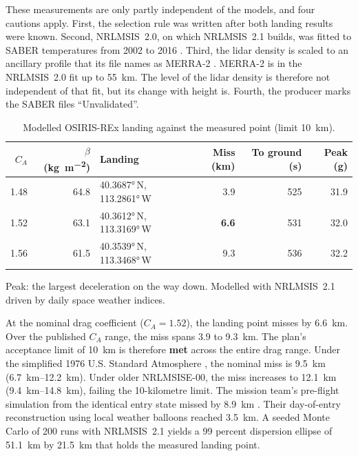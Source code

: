 \documentclass[11pt,a4paper]{article}
\begin{document}
These measurements are only partly independent of the models, and four cautions apply. First,
the selection rule was written after both landing results were known. Second, NRLMSIS~2.0, on
which NRLMSIS~2.1 builds, was fitted to SABER temperatures from 2002 to 2016
\citep{emmert2021}. Third, the lidar density is scaled to an ancillary profile that its file
names as MERRA-2 \citep{gelaro2017}. MERRA-2 is in the NRLMSIS~2.0 fit up to \qty{55}{\km}. The
level of the lidar density is therefore not independent of that fit, but its change with height
is. Fourth, the producer marks the SABER files ``Unvalidated''.

\begin{table}[htbp]
\centering\small
\caption{Modelled OSIRIS-REx landing against the measured point (limit \qty{10}{\km}).}
\label{tab:capsule}
\begin{tabular}{@{}rrlrrr@{}}
\toprule
$C_A$ & $\beta$ (\unit{\kg\per\m\squared}) & Landing & Miss (\unit{\km}) & To ground (\unit{\s}) & Peak (g) \\
\midrule
1.48 & 64.8 & \ang{40.3687}\,N, \ang{113.2861}\,W & 3.9 & 525 & 31.9 \\
1.52 & 63.1 & \ang{40.3612}\,N, \ang{113.3169}\,W & \textbf{6.6} & 531 & 32.0 \\
1.56 & 61.5 & \ang{40.3539}\,N, \ang{113.3468}\,W & 9.3 & 536 & 32.2 \\
\bottomrule
\end{tabular}
\par\smallskip\footnotesize Peak: the largest deceleration on the way down. Modelled with
NRLMSIS~2.1 driven by daily space weather indices.
\end{table}

At the nominal drag coefficient ($C_A = 1.52$), the landing point misses by \qty{6.6}{\km}.
Over the published $C_A$ range, the miss spans 3.9 to \qty{9.3}{\km}. The plan's acceptance
limit of \qty{10}{\km} is therefore \textbf{met} across the entire drag range. Under the simplified
1976 U.S. Standard Atmosphere \citep{ussa1976}, the nominal miss is \qty{9.5}{\km}
(\qtyrange{6.7}{12.2}{\km}). Under older NRLMSISE-00, the miss increases to \qty{12.1}{\km}
(\qtyrange{9.4}{14.8}{\km}), failing the 10-kilometre limit. The mission team's pre-flight
simulation from the identical entry state missed by \qty{8.9}{\km}
\citep{francis2024}. Their day-of-entry reconstruction using local weather balloons reached
\qty{3.5}{\km}. A seeded Monte Carlo of 200 runs with NRLMSIS~2.1 yields a 99 percent dispersion
ellipse of \qty{51.1}{\km} by \qty{21.5}{\km} that holds the measured landing point.
\end{document}
